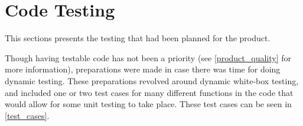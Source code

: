 \section{Code Testing}
This sections presents the testing that had been planned for the product. 

Though having testable code has not been a priority (see \autoref{product_quality} for more information), preparations were made in case there was time for doing dynamic testing. 
These preparations revolved around dynamic white-box testing, and included one or two test cases for many different functions in the code that would allow for some unit testing to take place. 
These test cases can be seen in \autoref{test_cases}. 
